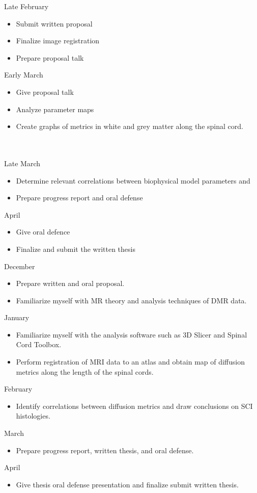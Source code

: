 Late February
\begin{itemize}
    \item Submit written proposal
    \item Finalize image registration
    \item Prepare proposal talk
\end{itemize}

Early March
\begin{itemize}
    \item Give proposal talk
    \item Analyze parameter maps
    \item Create graphs of \dmri metrics in white and grey matter \roi along the spinal cord.
\end{itemize}

\phantom{more line}\\
\phantom{more line}\\

Late March
\begin{itemize}
    \item Determine relevant correlations between biophysical model parameters and \sci
    \item Prepare progress report and oral defense
\end{itemize}

April
\begin{itemize}
    \item Give oral defence
    \item Finalize and submit the written thesis
\end{itemize}


December
\begin{itemize}
    \item Prepare written and oral proposal.
    \item Familiarize myself with MR theory and analysis techniques of DMR data.
\end{itemize}

January
\begin{itemize}
    \item Familiarize myself with the analysis software such as 3D Slicer and Spinal Cord Toolbox.
    \item Perform registration of MRI data to an atlas and obtain map of diffusion metrics along the length of the spinal cords.
\end{itemize}

February
\begin{itemize}
    \item Identify correlations between diffusion metrics and draw conclusions on SCI histologies.
\end{itemize}

March
\begin{itemize}
    \item Prepare progress report, written thesis, and oral defense.
\end{itemize}

April
\begin{itemize}
    \item Give thesis oral defense presentation and finalize submit written thesis.
\end{itemize}
\fi
